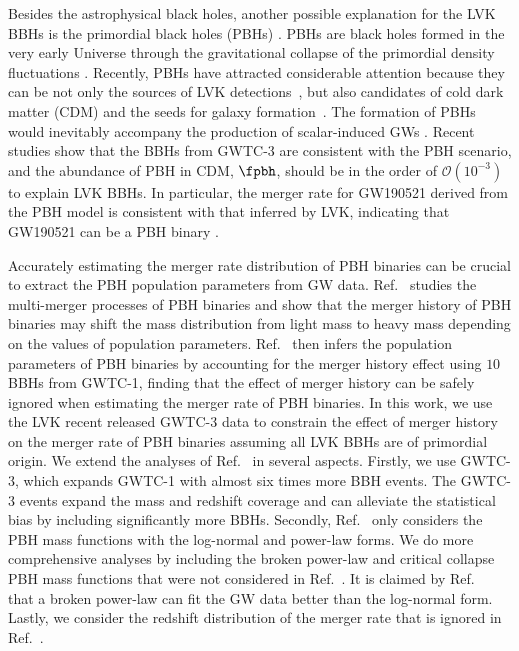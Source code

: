 \documentclass[
reprint,           %
superscriptaddress,%
amsmath,           %
amssymb,           %
aps,               %
prd,               %
notitlepage,       %
longbibliography,  %
floatfix,          %
nofootinbib,
]{revtex4-1}
\begin{document}
Besides the astrophysical black holes, another possible explanation for the LVK BBHs is the primordial black holes (PBHs) \cite{Bird:2016dcv,Sasaki:2016jop,Chen:2018czv,Liu:2018ess,Chen:2021nxo}. 
PBHs are black holes formed in the very early Universe through the gravitational collapse of the primordial density fluctuations \cite{Hawking:1971ei,Carr:1974nx}. Recently, PBHs have attracted considerable attention \cite{Garcia-Bellido:2017mdw,Carr:2017jsz,Germani:2017bcs,Liu:2019rnx,Cai:2019elf,Cai:2019bmk,DeLuca:2020sae,Vaskonen:2020lbd,DeLuca:2020agl,Hutsi:2020sol,Sasaki:2018dmp,Carr:2020gox,Carr:2020xqk,Liu:2021jnw,Franciolini:2022tfm} because they can be not only the sources of LVK detections~\cite{Bird:2016dcv,Sasaki:2016jop}, but also candidates of cold dark matter (CDM) \cite{Carr:2016drx} and the seeds for galaxy formation~\cite{Bean:2002kx,Kawasaki:2012kn}. The formation of PBHs would inevitably accompany the production of scalar-induced GWs \cite{Saito:2008jc,Yuan:2019udt,Yuan:2019wwo,Yuan:2019fwv,Chen:2019xse,DeLuca:2019ufz,Bartolo:2018rku,Bartolo:2018evs}.
Recent studies \cite{Chen:2021nxo,Chen:2022fda} show that the BBHs from GWTC-3 are consistent with the PBH scenario, and the abundance of PBH in CDM, $\fpbh$, should be in the order of $\mathcal{O}(10^{-3})$ to explain LVK BBHs. In particular, the merger rate for GW190521 derived from the PBH model is consistent with that inferred by LVK, indicating that GW190521 can be a PBH binary \cite{DeLuca:2020sae,Chen:2021nxo}.

Accurately estimating the merger rate distribution of PBH binaries can be crucial to extract the PBH population parameters from GW data. Ref.~\cite{Liu:2019rnx} studies the multi-merger processes of PBH binaries and show that the merger history of PBH binaries may shift the mass distribution from light mass to heavy mass depending on the values of population parameters. Ref.~\cite{Wu:2020drm} then infers the population parameters of PBH binaries by accounting for the merger history effect using $10$ BBHs from GWTC-1, finding that the effect of merger history can be safely ignored when estimating the merger rate of PBH binaries. 
In this work, we use the LVK recent released GWTC-3 data to constrain the effect of merger history on the merger rate of PBH binaries assuming all LVK BBHs are of primordial origin.
We extend the analyses of Ref.~\cite{Wu:2020drm} in several aspects. Firstly, we use GWTC-3, which expands GWTC-1 with almost six times more BBH events. The GWTC-3 events expand the mass and redshift coverage and can alleviate the statistical bias by including significantly more BBHs. Secondly, Ref.~\cite{Wu:2020drm} only considers the PBH mass functions with the log-normal and power-law forms. We do more comprehensive analyses by including the broken power-law and critical collapse PBH mass functions that were not considered in Ref.~\cite{Wu:2020drm}. It is claimed by Ref.~\cite{Deng:2021ezy} that a broken power-law can fit the GW data better than the log-normal form. Lastly, we consider the redshift distribution of the merger rate that is ignored in Ref.~\cite{Wu:2020drm}.
\end{document}
